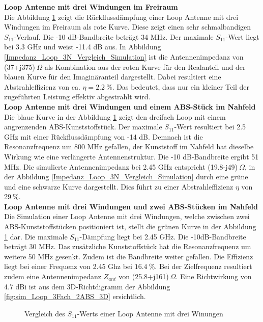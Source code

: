 \textbf{Loop Antenne mit drei Windungen im Freiraum}\\
Die Abbildung \ref{S11_Loop_3N_Vergleich_Simulation} zeigt die Rückflussdämpfung einer Loop Antenne mit drei Windungen im Freiraum als rote Kurve. Diese zeigt einen sehr schmalbandigen $S_{11}$-Verlauf. Die -10 dB-Bandbreite beträgt 34 MHz. Der maximale $S_{11}$-Wert liegt bei 3.3 GHz und weist -11.4 dB aus. In Abbildung \ref{Impedanz_Loop_3N_Vergleich_Simulation} ist die Antennenimpedanz von (37+j375)$\ \Omega$ als Kombination aus der roten Kurve für den Realanteil und der blauen Kurve für den Imaginäranteil dargestellt. Dabei resultiert eine Abstrahleffizienz von ca. $\eta=2.2\ \%$. Das bedeutet, dass nur ein kleiner Teil der zugeführten Leistung effektiv abgestrahlt wird.\\

\textbf{Loop Antenne mit drei Windungen und einem ABS-Stück im Nahfeld}\\
Die blaue Kurve in der Abbildung \ref{S11_Loop_3N_Vergleich_Simulation} zeigt den dreifach Loop mit einem angrenzenden ABS-Kunststoffstück. Der maximale $S_{11}$-Wert resultiert bei 2.5 GHz mit einer Rückflussdämpfung von -14 dB. Demnach ist die Resonanzfrequenz um 800 MHz gefallen, der Kunststoff im Nahfeld hat dieselbe Wirkung wie eine verlängerte Antennenstruktur. Die -10 dB-Bandbreite ergibt 51 MHz. Die simulierte Antennenimpedanz bei 2.45 GHz entspricht (19.8-j49)$\ \Omega$, in der Abbildung \ref{Impedanz_Loop_3N_Vergleich_Simulation} durch eine grüne und eine schwarze Kurve dargestellt. Dies führt zu einer Abstrahleffizienz $\eta$ von 29$\ \%$. \\

\textbf{Loop Antenne mit drei Windungen und zwei ABS-Stücken im Nahfeld}\\
Die Simulation einer Loop Antenne mit drei Windungen, welche zwischen zwei ABS-Kunststoffstücken positioniert ist, stellt die grünen Kurve in der Abbildung \ref{S11_Loop_3N_Vergleich_Simulation} dar. Die maximale $S_{11}$-Dämpfung liegt bei 2.45 GHz. Die -10dB-Bandbreite beträgt 30 MHz. Das zusätzliche Kunststoffstück hat die Resonanzfrequenz um weitere 50 MHz gesenkt. Zudem ist die Bandbreite weiter gefallen. Die Effizienz liegt bei einer Frequenz von 2.45 Ghz bei $16.4\ \%$. Bei der Zielfrequenz resultiert zudem eine Antennenimpedanz $Z_{ant}$ von (25.8+j161)$\ \Omega$. Eine Richtwirkung von 4.7 dBi ist aus dem 3D-Richtdigramm der Abbildung \ref{fig:sim_Loop_3Fach_2ABS_3D} ersichtlich.
\newpage
\begin{figure}[!ht]
	\centering
	\begingroup
	
	\endgroup
	\caption{Vergleich des $S_{11}$-Werts einer Loop Antenne mit drei Winungen}
	\label{S11_Loop_3N_Vergleich_Simulation}
\end{figure}

